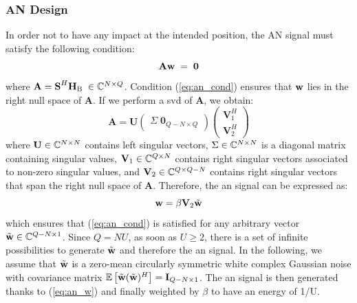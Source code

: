  


\subsubsection{AN Design}
In order not to have any impact at the intended position, the AN signal must satisfy the following condition:
\begin{equation}
    \textbf{A} \textbf{w} \; = \; \textbf{0}
    \label{eq:an_cond}
\end{equation}
where $\textbf{A} = \textbf{S}^H\textbf{H}_{\text{B}}\; \in \mathbb{C}^{N\times Q}$. Condition (\ref{eq:an_cond}) ensures that $\textbf{w}$ lies in the right null space of $\textbf{A}$. If we perform a \gls{svd} of $\textbf{A}$, we obtain:
\begin{equation}
    \textbf{A} = \textbf{U} 
    \begin{pmatrix}
    \Sigma \; \textbf{0}_{Q-N\times Q}
    \end{pmatrix}
    \begin{pmatrix}
    \textbf{V}_1^H \\
    \textbf{V}_2^H
    \end{pmatrix}
    \label{eq:an_svd}
\end{equation}
where $\textbf{U} \in \mathbb{C}^{N \times N}$ contains left singular vectors, $\Sigma \in \mathbb{C}^{N \times N}$ is a diagonal matrix containing singular values, $\textbf{V}_1 \in \mathbb{C}^{Q \times N}$ contains right singular vectors associated to non-zero singular values, and $\textbf{V}_2 \in \mathbb{C}^{Q \times Q-N}$ contains right singular vectors that span the right null space of $\textbf{A}$. Therefore, the \gls{an} signal can be expressed as:
\begin{equation}
    \textbf{w} = \beta \textbf{V}_2 \tilde{\textbf{w}}
    \label{eq:an_w}
\end{equation}
which ensures that (\ref{eq:an_cond}) is satisfied for any arbitrary vector $\tilde{\textbf{w}} \in \mathbb{C}^{Q-N \times 1}$. Since $Q = NU$, as soon as $U\geq 2$, there is a set of infinite possibilities to generate $\tilde{\textbf{w}}$ and therefore the \gls{an} signal. In the following, we assume that $\tilde{\textbf{w}}$ is a zero-mean circularly symmetric white complex Gaussian noise with covariance matrix $\mathbb{E} \left[\tilde{\textbf{w}}(\tilde{\textbf{w}})^H\right] = \textbf{I}_{Q-N \times 1}$. The \gls{an} signal is then generated thanks to (\ref{eq:an_w}) and finally weighted by $\beta$ to have an energy of 1/U.


